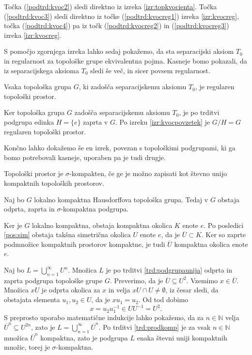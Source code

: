 \documentclass[mat1]{fmfdelo}
\newcommand{\N}{\mathbb N}
\newcommand{\closure}[1]{\overline{#1}}
\begin{document}
\begin{dokaz}
Točka (\ref{podtrd:kvoc2}) sledi direktno iz izreka \ref{izr:topkvocienta}.
Točka (\ref{podtrd:kvoc3}) sledi direktno iz točke (\ref{podtrd:kvocreg1}) izreka \ref{izr:kvocreg}, točka (\ref{podtrd:kvoc4}) pa iz točk (\ref{podtrd:kvocreg2}) in (\ref{podtrd:kvocreg3}) izreka \ref{izr:kvocreg}.
\end{dokaz}

S pomočjo zgornjega izreka lahko sedaj pokažemo, da sta separacijski aksiom $T_0$ in regularnost za topološke grupe ekvivalentna pojma. Kasneje bomo pokazali, da iz separacijskega aksioma $T_0$ sledi še več, in sicer povsem regularnost.

\begin{posledica}\label{izr:t3}
	Vsaka topološka grupa $G$, ki zadošča separacijskemu aksiomu $T_0$, je regularen topološki prostor.
\end{posledica}

\begin{dokaz}
Ker topološka grupa $G$ zadošča separacijskemu aksiomu $T_0$, je po trditvi podgrupa edinka $H = \lbrace e \rbrace$ zaprta v $G$. Po izreku \ref{izr:kvocpovzetek} je $G/H = G$ regularen topološki prostor.
\end{dokaz}

Končno lahko dokažemo še en izrek, povezan s topološkimi podgrupami, ki ga bomo potrebovali kasneje, uporaben pa je tudi drugje.

\begin{definicija}
	Topološki prostor je $\sigma$-kompakten, če ge je možno zapisati kot števno unijo kompaktnih topoloških prostorov.
\end{definicija}

\begin{izrek}\label{izr:odpzapsigma}
	Naj bo $G$ lokalno kompaktna Hausdorffova topološka grupa. Tedaj v $G$ obstaja odprta, zaprta in $\sigma$-kompaktna podgrupa.
\end{izrek}

\begin{dokaz}
	Ker je $G$ lokalno kompaktna, obstaja kompaktna okolica $K$ enote $e$. Po posledici \ref{pos:sim} obstaja takšna simetrična okolica $U$ enote $e$, da je $\closure{U} \subset K$. Ker so zaprte podmnožice kompaktnih prostorov kompaktne, je tudi $\closure{U}$ kompaktna okolica enote $e$.
	
	Naj bo $L = \bigcup_{n=1}^\infty U^n$. Množica $L$ je po trditvi \ref{trd:podgrupaunija} odprta in zaprta podgrupa topološke grupe $G$.
	Preverimo, da je $\closure{U} \subseteq U^2$. Vzemimo $x \in \closure{U}$. Množica $xU$ je odprta okolica za $x$ in velja $xU \cap U \neq \emptyset$, iz česar sledi, da obstajata elementa $u_1,u_2 \in U$, da je $xu_1 = u_2$. Od tod dobimo
	\[ x = u_2u_1^{-1} \in UU^{-1} = U^2. \]
	S preprosto uporabo matematične indukcije lahko pokažemo, da za $n \in \N$ velja $\closure{U}^n \subseteq U^{2n}$, zato je $L = \bigcup_{n=1}^\infty \closure{U}^n$. Po trditvi \ref{trd:prodkomp} je za vsak $n \in \N$ množica $\closure{U}^n$ kompaktna, zato je podgrupa $L$ enaka števni uniji kompaktnih množic, torej je $\sigma$-kompaktna.
\end{dokaz}
\end{document}
